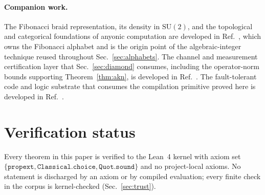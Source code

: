 \documentclass[aps,pra,reprint,nofootinbib,superscriptaddress]{revtex4-2}
\newcommand{\su}[1]{\mathrm{SU}(#1)}
\theoremstyle{plain}
\theoremstyle{definition}
\begin{document}
\paragraph{Companion work.} The Fibonacci braid representation, its density in
$\su 2$, and the topological and categorical foundations of anyonic computation
are developed in Ref.~\cite{RoehmD4Topological}, which owns the Fibonacci
alphabet and is the origin point of the algebraic-integer technique reused
throughout Sec.~\ref{sec:alphabets}. The channel and measurement certification
layer that Sec.~\ref{sec:diamond} consumes, including the operator-norm bounds
supporting Theorem~\ref{thm:akn}, is developed in
Ref.~\cite{RoehmD9Certification}. The fault-tolerant code and logic substrate
that consumes the compilation primitive proved here is developed in
Ref.~\cite{RoehmD6FaultTolerant}.

\appendix

\section{Verification status}
\label{app:verification}

Every theorem in this paper is verified to the Lean~4 kernel with axiom set
$\{\texttt{propext}, \texttt{Classical.choice}, \texttt{Quot.sound}\}$ and no
project-local axioms. No statement is discharged by an axiom or by compiled
evaluation; every finite check in the corpus is kernel-checked
(Sec.~\ref{sec:trust}).
\end{document}
